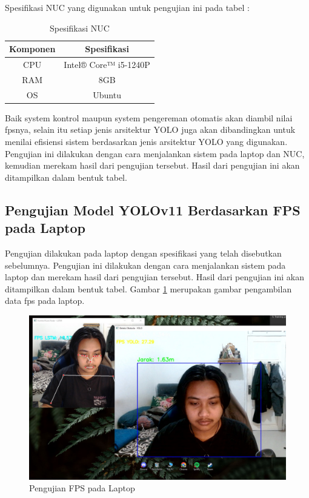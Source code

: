 Spesifikasi NUC yang digunakan untuk pengujian ini pada tabel  :

\begin{longtable}{|c|c|}
    \caption{Spesifikasi NUC}
    \label{tb:Spesifikasi NUC}                             \\
    \hline   
    \rowcolor[HTML]{C0C0C0}
    \textbf{Komponen} & \textbf{Spesifikasi} \\
    \hline
  CPU            &  Intel® Core™ i5-1240P        \\
  RAM            & 8GB        \\
  OS            & Ubuntu           \\
  \hline
\end{longtable}

Baik system kontrol maupun system pengereman otomatis akan diambil nilai fpsnya, selain itu setiap jenis arsitektur YOLO juga akan dibandingkan untuk menilai efisiensi sistem berdasarkan jenis arsitektur YOLO yang digunakan. Pengujian ini dilakukan dengan cara menjalankan sistem pada laptop dan NUC, kemudian merekam hasil dari pengujian tersebut. Hasil dari pengujian ini akan ditampilkan dalam bentuk tabel.

\subsection{Pengujian Model YOLOv11 Berdasarkan FPS pada Laptop}

Pengujian dilakukan pada laptop dengan spesifikasi yang telah disebutkan sebelumnya. Pengujian ini dilakukan dengan cara menjalankan sistem pada laptop dan merekam hasil dari pengujian tersebut. Hasil dari pengujian ini akan ditampilkan dalam bentuk tabel. Gambar \ref{fig:Foto pengujian fps laptop} merupakan gambar pengambilan data fps pada laptop.

\begin{figure} [H] \centering
  \includegraphics[scale=0.3]{gambar/devafps.jpg}
  \caption{Pengujian FPS pada Laptop}
  \label{fig:Foto pengujian fps laptop}
\end{figure}


